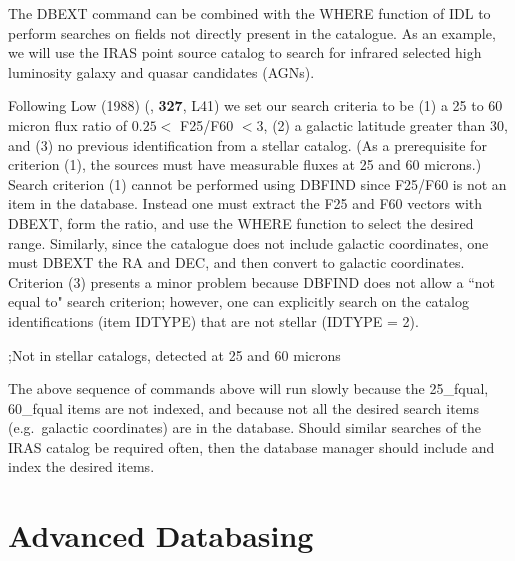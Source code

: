 The DBEXT command can be combined with the WHERE function of IDL to 
perform searches on fields not directly present in the catalogue.
As an example, we will use the IRAS point source catalog to search
for infrared selected high luminosity galaxy and quasar candidates (AGNs).  

Following Low \ea (1988)
(\apjl, {\bf 327}, L41) we set our search criteria to be (1) a 25 to 60
micron flux ratio of $0.25 <$ F25/F60 $< 3$,
(2) a galactic latitude greater than 30\de, and (3) no previous
identification from a stellar catalog.  (As a prerequisite for criterion
(1), the sources must have measurable fluxes at 25 and 60 microns.)
Search criterion (1) cannot be performed using DBFIND since F25/F60 is
not an item in the database.  Instead one must extract the F25 and F60
vectors with DBEXT, form the ratio, and use the WHERE function to 
select the desired
range.  Similarly, since the catalogue does not include galactic coordinates,
one must DBEXT the RA and DEC, and then convert to galactic coordinates. 
Criterion (3) presents a minor problem because DBFIND does not allow
a ``not equal to" search criterion; however, one can explicitly search
on the catalog identifications (item IDTYPE) that are not stellar
(IDTYPE = 2).

\exbegin
{}
{;Not in stellar catalogs, detected at 25 and 60 microns}
\exend

The above sequence of commands above will run slowly
because the 25\_fqual, 60\_fqual items are not indexed,
and because not all the desired search items (e.g.\ galactic coordinates)
are in the database.   Should similar searches of the IRAS catalog be required
often, 
then the database manager should include and index the desired items.
\section{Advanced Databasing}
